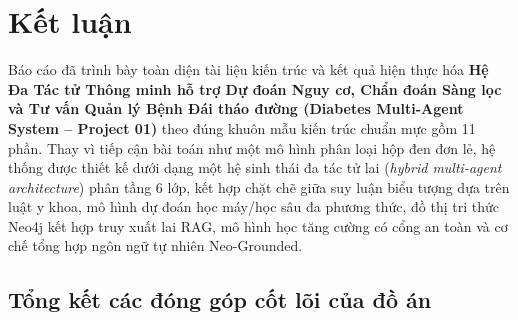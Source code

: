 \chapter{Kết luận}

Báo cáo đã trình bày toàn diện tài liệu kiến trúc và kết quả hiện thực hóa \textbf{Hệ Đa Tác tử Thông minh hỗ trợ Dự đoán Nguy cơ, Chẩn đoán Sàng lọc và Tư vấn Quản lý Bệnh Đái tháo đường (Diabetes Multi-Agent System -- Project 01)} theo đúng khuôn mẫu kiến trúc chuẩn mực gồm 11 phần. Thay vì tiếp cận bài toán như một mô hình phân loại hộp đen đơn lẻ, hệ thống được thiết kế dưới dạng một hệ sinh thái đa tác tử lai (\emph{hybrid multi-agent architecture}) phân tầng 6 lớp, kết hợp chặt chẽ giữa suy luận biểu tượng dựa trên luật y khoa, mô hình dự đoán học máy/học sâu đa phương thức, đồ thị tri thức Neo4j kết hợp truy xuất lai RAG, mô hình học tăng cường có cổng an toàn và cơ chế tổng hợp ngôn ngữ tự nhiên Neo-Grounded.

\section*{Tổng kết các đóng góp cốt lõi của đồ án}

